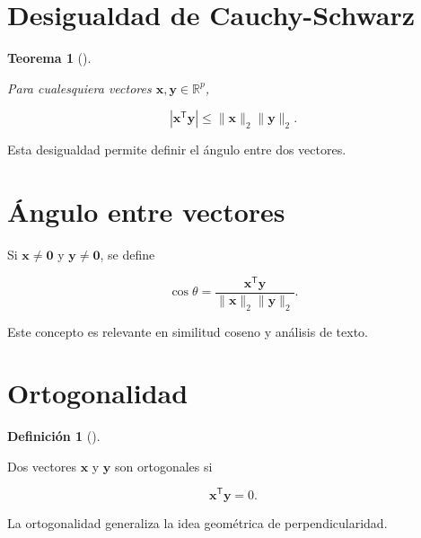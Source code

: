 \documentclass[
  spanish,
  10.5pt,
  letterpaper,
  DIV=11,
  numbers=noendperiod,
  oneside,
  open=any]{scrreprt}
\theoremstyle{definition}
\newtheorem{definition}{Definición}[chapter]
\theoremstyle{definition}
\theoremstyle{plain}
\newtheorem{theorem}{Teorema}[chapter]
\theoremstyle{remark}
\begin{document}
\section*{Desigualdad de
Cauchy-Schwarz}\label{desigualdad-de-cauchy-schwarz}


\begin{theorem}[]\protect\hypertarget{thm-cauchy-schwarz}{}\label{thm-cauchy-schwarz}

Para cualesquiera vectores \(\mathbf{x},\mathbf{y}\in\mathbb{R}^{p}\),

\[
|\mathbf{x}^{\mathsf T}\mathbf{y}|
\leq
\|\mathbf{x}\|_2
\|\mathbf{y}\|_2.
\]

\end{theorem}

Esta desigualdad permite definir el ángulo entre dos vectores.

\section*{Ángulo entre vectores}\label{uxe1ngulo-entre-vectores}


Si \(\mathbf{x}\neq\mathbf{0}\) y \(\mathbf{y}\neq\mathbf{0}\), se
define

\[
\cos\theta
=
\frac{
\mathbf{x}^{\mathsf T}\mathbf{y}
}{
\|\mathbf{x}\|_2\|\mathbf{y}\|_2
}.
\]

Este concepto es relevante en similitud coseno y análisis de texto.

\section*{Ortogonalidad}\label{ortogonalidad}


\begin{definition}[]\protect\hypertarget{def-ortogonalidad}{}\label{def-ortogonalidad}

Dos vectores \(\mathbf{x}\) y \(\mathbf{y}\) son ortogonales si

\[
\mathbf{x}^{\mathsf T}\mathbf{y}=0.
\]

\end{definition}

La ortogonalidad generaliza la idea geométrica de perpendicularidad.
\end{document}
